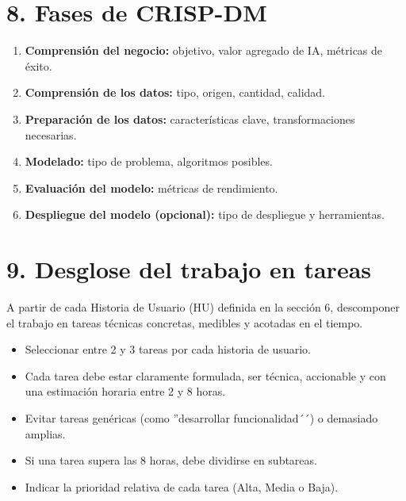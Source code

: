 \documentclass[
11pt, %
]{charter}
\begin{document}

\section{8. Fases de CRISP-DM}

\begin{enumerate}
  \item \textbf{Comprensión del negocio:} objetivo, valor agregado de IA, métricas de éxito.
  \item \textbf{Comprensión de los datos:} tipo, origen, cantidad, calidad.
  \item \textbf{Preparación de los datos:} características clave, transformaciones necesarias.
  \item \textbf{Modelado:} tipo de problema, algoritmos posibles.
  \item \textbf{Evaluación del modelo:} métricas de rendimiento.
  \item \textbf{Despliegue del modelo (opcional):} tipo de despliegue y herramientas.
\end{enumerate}

\section{9. Desglose del trabajo en tareas}
\label{sec:wbs}

A partir de cada Historia de Usuario (HU) definida en la sección 6, descomponer el trabajo en tareas técnicas concretas, medibles y acotadas en el tiempo.

\begin{itemize}
\item Seleccionar entre 2 y 3 tareas por cada historia de usuario.
\item Cada tarea debe estar claramente formulada, ser técnica, accionable y con una estimación horaria entre 2 y 8 horas.
\item Evitar tareas genéricas (como ''desarrollar funcionalidad´´) o demasiado amplias.
\item Si una tarea supera las 8 horas, debe dividirse en subtareas.
\item Indicar la prioridad relativa de cada tarea (Alta, Media o Baja).
\end{itemize}
\end{document}
